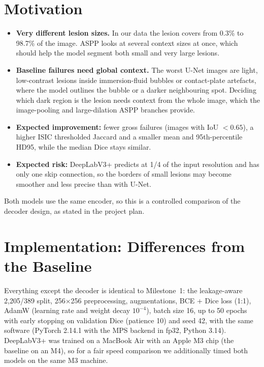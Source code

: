 \documentclass[11pt,a4paper]{article}
\begin{document}
\section{Motivation}

\begin{itemize}[noitemsep]
\item \textbf{Very different lesion sizes.} In our data the lesion covers from 0.3\% to
98.7\% of the image. ASPP looks at several context sizes at once, which should help the
model segment both small and very large lesions.
\item \textbf{Baseline failures need global context.} The worst U-Net images are light,
low-contrast lesions inside immersion-fluid bubbles or contact-plate artefacts, where
the model outlines the bubble or a darker neighbouring spot. Deciding which dark region
is the lesion needs context from the whole image, which the image-pooling and
large-dilation ASPP branches provide.
\item \textbf{Expected improvement:} fewer gross failures (images with IoU $<0.65$), a higher
ISIC thresholded Jaccard and a smaller mean and 95th-percentile HD95, while the median
Dice stays similar.
\item \textbf{Expected risk:} DeepLabV3+ predicts at 1/4 of the input resolution and has only
one skip connection, so the borders of small lesions may become smoother and less
precise than with U-Net.
\end{itemize}
Both models use the same encoder, so this is a controlled comparison of the decoder design,
as stated in the project plan.

\section{Implementation: Differences from the Baseline}

Everything except the decoder is identical to Milestone~1: the leakage-aware 2,205/389 split,
256$\times$256 preprocessing, augmentations, BCE + Dice loss (1:1), AdamW (learning rate and
weight decay $10^{-4}$), batch size 16, up to 50 epochs with early stopping on validation Dice
(patience 10) and seed 42, with the same software (PyTorch 2.14.1 with the MPS backend in fp32,
Python 3.14). DeepLabV3+ was trained on a MacBook Air with an Apple M3 chip (the baseline on an M4),
so for a fair speed comparison we additionally timed both models on the same M3 machine.
\end{document}
